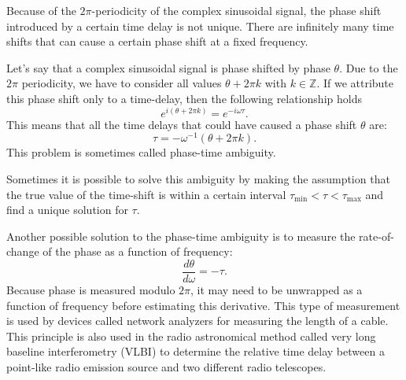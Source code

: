 \begin{marginfigure}
  \begin{center}
  \end{center}
  \caption{Phase shift introduced to a complex sinusoidal signal by a time-shift system. The phase shift caused by a constant time shift is linearly dependent on angular frequency.}
  \label{fig:timeshift_phase}
\end{marginfigure}

Because of the $2\pi$-periodicity of the complex sinusoidal signal,
the phase shift introduced by a certain time delay is not
unique. There are infinitely many time shifts that can cause a certain
phase shift at a fixed frequency.

Let's say that a complex sinusoidal signal is phase shifted by phase
$\theta$. Due to the $2\pi$ periodicity, we have to consider all
values $\theta + 2\pi k$ with $k\in\mathbb{Z}$. If we attribute this
phase shift only to a time-delay, then the following relationship holds
\begin{equation}
  e^{i (\theta+2\pi k)} = e^{-i \omega \tau}.
\end{equation}
This means that all the time delays that could have caused a phase shift $\theta$ are:
\begin{equation}
  \tau = -\omega^{-1}(\theta+2\pi k).
\end{equation}
This problem is sometimes called phase-time ambiguity.

Sometimes it is possible to solve this ambiguity by making the assumption that the true value
of the time-shift is within a certain interval $\tau_{\mathrm{min}} < \tau < \tau_{\mathrm{max}}$
and find a unique solution for $\tau$.

Another possible solution to the phase-time ambiguity is to measure the rate-of-change of the
phase as a function of frequency:
\begin{equation}
  \frac{d\theta}{d\omega} = -\tau.
\end{equation}
Because phase is measured modulo $2\pi$, it may need to be unwrapped as a function
of frequency before estimating this derivative.
This type of measurement is used by devices called network analyzers for measuring the length of a cable.
This principle is also used in the radio astronomical method called very long baseline interferometry (VLBI)
to determine the relative time delay between a point-like radio emission source and two different radio telescopes.

